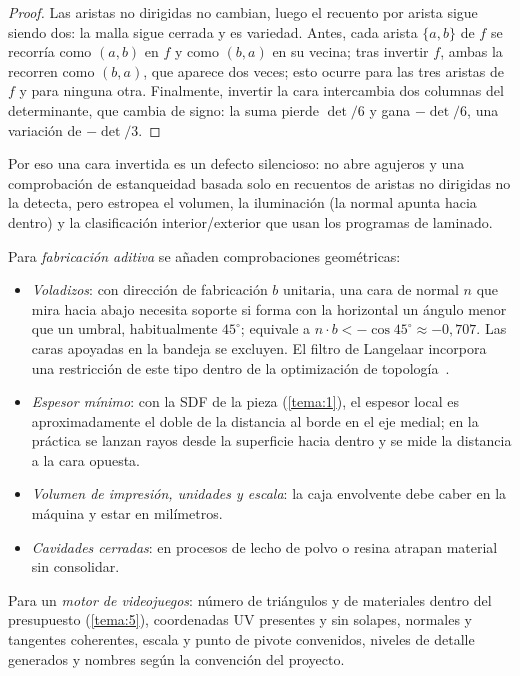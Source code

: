 \begin{proof}
Las aristas no dirigidas no cambian, luego el recuento por arista sigue siendo dos: la malla sigue cerrada y es variedad. Antes, cada arista $\{a,b\}$ de $f$ se recorría como $(a,b)$ en $f$ y como $(b,a)$ en su vecina; tras invertir $f$, ambas la recorren como $(b,a)$, que aparece dos veces; esto ocurre para las tres aristas de $f$ y para ninguna otra. Finalmente, invertir la cara intercambia dos columnas del determinante, que cambia de signo: la suma pierde $\det/6$ y gana $-\det/6$, una variación de $-\det/3$.
\end{proof}

Por eso una cara invertida es un defecto silencioso: no abre agujeros y una comprobación de estanqueidad basada solo en recuentos de aristas no dirigidas no la detecta, pero estropea el volumen, la iluminación (la normal apunta hacia dentro) y la clasificación interior/exterior que usan los programas de laminado.

Para \emph{fabricación aditiva} se añaden comprobaciones geométricas:
\begin{itemize}[leftmargin=1.4em]
  \item \emph{Voladizos}: con dirección de fabricación $b$ unitaria, una cara de normal $n$ que mira hacia abajo necesita soporte si forma con la horizontal un ángulo menor que un umbral, habitualmente $45^\circ$; equivale a $n\cdot b<-\cos 45^\circ\approx-0{,}707$. Las caras apoyadas en la bandeja se excluyen. El filtro de Langelaar incorpora una restricción de este tipo dentro de la optimización de topología~\cite{langelaar}.
  \item \emph{Espesor mínimo}: con la SDF de la pieza (\cref{tema:1}), el espesor local es aproximadamente el doble de la distancia al borde en el eje medial; en la práctica se lanzan rayos desde la superficie hacia dentro y se mide la distancia a la cara opuesta.
  \item \emph{Volumen de impresión, unidades y escala}: la caja envolvente debe caber en la máquina y estar en milímetros.
  \item \emph{Cavidades cerradas}: en procesos de lecho de polvo o resina atrapan material sin consolidar.
\end{itemize}
Para un \emph{motor de videojuegos}: número de triángulos y de materiales dentro del presupuesto (\cref{tema:5}), coordenadas UV presentes y sin solapes, normales y tangentes coherentes, escala y punto de pivote convenidos, niveles de detalle generados y nombres según la convención del proyecto.

